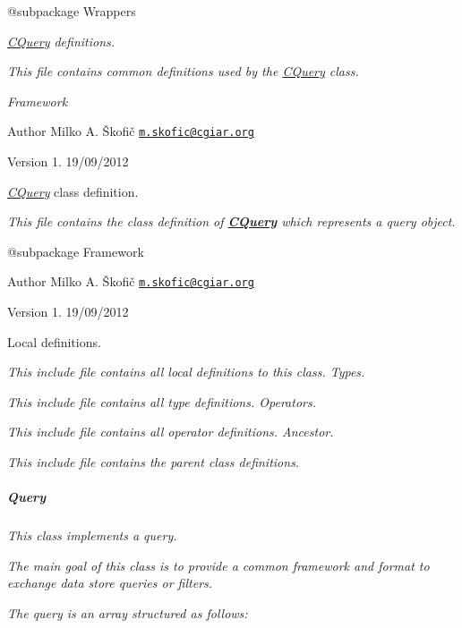 {\itshape \begin{DoxyVerb} @subpackage        Wrappers\end{DoxyVerb}
}

{\itshape \hyperlink{class_c_query}{C\-Query} definitions.}

{\itshape This file contains common definitions used by the \hyperlink{class_c_query}{C\-Query} class.}

{\itshape  Framework}

{\itshape \begin{DoxyAuthor}{Author}
Milko A. Škofič \href{mailto:m.skofic@cgiar.org}{\tt m.\-skofic@cgiar.\-org} 
\end{DoxyAuthor}
\begin{DoxyVersion}{Version}
1. 19/09/2012
\end{DoxyVersion}
{\itshape \hyperlink{class_c_query}{C\-Query}} class definition.}

{\itshape This file contains the class definition of {\bfseries \hyperlink{class_c_query}{C\-Query}} which represents a query object.}

{\itshape \begin{DoxyVerb} @subpackage        Framework
\end{DoxyVerb}
}

{\itshape \begin{DoxyAuthor}{Author}
Milko A. Škofič \href{mailto:m.skofic@cgiar.org}{\tt m.\-skofic@cgiar.\-org} 
\end{DoxyAuthor}
\begin{DoxyVersion}{Version}
1. 19/09/2012
\end{DoxyVersion}
Local definitions.}

{\itshape This include file contains all local definitions to this class. Types.}

{\itshape This include file contains all type definitions. Operators.}

{\itshape This include file contains all operator definitions. Ancestor.}

{\itshape This include file contains the parent class definitions. \subparagraph*{Query}}

{\itshape }

{\itshape This class implements a query.}

{\itshape The main goal of this class is to provide a common framework and format to exchange data store queries or filters.}

{\itshape The query is an array structured as follows\-:}

